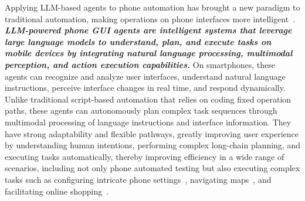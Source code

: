 Applying LLM-based agents to phone automation has brought a new paradigm to traditional automation, making operations on phone interfaces more intelligent~\cite{hong2024cogagent,zheng2024gpt,zhang2023appagent,song2023navigating}. \textbf{\textit{LLM-powered phone GUI agents are intelligent systems that leverage large language models to understand, plan, and execute tasks on mobile devices by integrating natural language processing, multimodal perception, and action execution capabilities.}} On smartphones, these agents can recognize and analyze user interfaces, understand natural language instructions, perceive interface changes in real time, and respond dynamically. Unlike traditional script-based automation that relies on coding fixed operation paths, these agents can autonomously plan complex task sequences through multimodal processing of language instructions and interface information. They have strong adaptability and flexible pathways, greatly improving user experience by understanding human intentions, performing complex long-chain planning, and executing tasks automatically, thereby improving efficiency in a wide range of scenarios, including not only phone automated testing but also executing complex tasks such as configuring intricate phone settings~\cite{wen2024autodroid}, navigating maps~\cite{wang2024mobileagentv1,wang2024mobileagentv2}, and facilitating online shopping~\cite{zhang2023appagent}.




